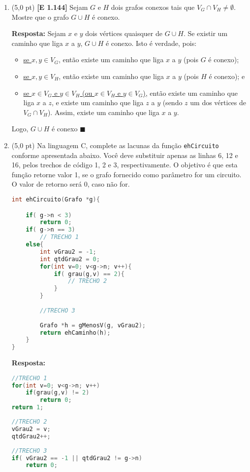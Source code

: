 \documentclass[12pt,a4paper,oneside]{article}
\begin{document}
\begin{enumerate}

	\item (5,0 pt) {\bf [E 1.144]} Sejam $G$ e $H$ dois grafos conexos tais que $V_G \cap V_H \not= \emptyset$. Mostre que o grafo $G \cup H$ é conexo. 
	
	
	{\color{blue} {\bf Resposta:}
		Sejam $x$ e $y$ dois vértices quaisquer de $G \cup H$. Se existir um caminho que liga $x$ a $y$, $G \cup H$ é conexo. Isto é verdade, pois:
		\begin{itemize}
			\item \underline{se $x, y \in V_G$}, então existe um caminho que liga $x$ a $y$ (pois $G$ é conexo);
			\item \underline{se $x, y \in V_H$}, então existe um caminho que liga $x$ a $y$ (pois $H$ é conexo); e
			\item \underline{se $x \in V_G$ e $y \in V_H$ (ou $x \in V_H$ e $y \in V_G$)}, então existe um caminho que liga $x$ a $z$, e existe um caminho que liga $z$ a $y$ (sendo $z$ um dos vértices de $V_G \cap V_H$). Assim, existe um caminho que liga $x$ a $y$. 
		\end{itemize}
	
		Logo, $G \cup H$ é conexo $\blacksquare$
	} \newpage
	
	\item (5,0 pt) Na linguagem C, complete as lacunas da função {\tt ehCircuito} conforme apresentada abaixo. Você deve substituir apenas as linhas 6, 12 e 16, pelos trechos de código 1, 2 e 3, respectivamente. O objetivo é que esta função retorne valor 1, se o grafo fornecido como parâmetro for um circuito. O valor de retorno será 0, caso não for.

\begin{lstlisting}[language=C]
int ehCircuito(Grafo *g){

	if( g->n < 3)
		return 0;
	if( g->n == 3)
		// TRECHO 1
	else{
		int vGrau2 = -1;
		int qtdGrau2 = 0;
		for(int v=0; v<g->n; v++){
			if( grau(g,v) == 2){
				// TRECHO 2
			}
		}
	
		//TRECHO 3
		
		Grafo *h = gMenosV(g, vGrau2);
		return ehCaminho(h);
	}
}\end{lstlisting}

{\color{blue} \bf Resposta: } \\
\begin{lstlisting}[language=C]
//TRECHO 1
for(int v=0; v<g->n; v++)
	if(grau(g,v) != 2)
		return 0;
return 1;
\end{lstlisting}

\begin{lstlisting}[language=C]
//TRECHO 2
vGrau2 = v;
qtdGrau2++;
\end{lstlisting}

\begin{lstlisting}[language=C]
//TRECHO 3
if( vGrau2 == -1 || qtdGrau2 != g->n)
	return 0;
\end{lstlisting}
	
\end{enumerate}
\end{document}
